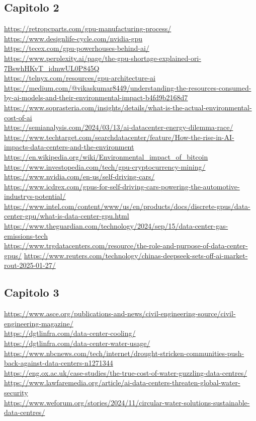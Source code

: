 \documentclass[12pt,a4paper,oneside]{book}
\begin{document}
\subsection*{Capitolo 2}
\url{https://retropcparts.com/gpu-manufacturing-process/} \\
\url{https://www.designlife-cycle.com/nvidia-gpu} \\
\url{https://tecex.com/gpu-powerhouses-behind-ai/} \\
\url{https://www.perplexity.ai/page/the-gpu-shortage-explained-ori-7BswhHKvT_idmwUL0P845Q} \\
\url{https://telnyx.com/resources/gpu-architecture-ai} \\
\url{https://medium.com/@vikaskumar8449/understanding-the-resources-consumed-by-ai-models-and-their-environmental-impact-b4fd9b2168d7} \\
\url{https://www.soprasteria.com/insights/details/what-is-the-actual-environmental-cost-of-ai} \\
\url{https://semianalysis.com/2024/03/13/ai-datacenter-energy-dilemma-race/} \\
\url{https://www.techtarget.com/searchdatacenter/feature/How-the-rise-in-AI-impacts-data-centers-and-the-environment} \\
\url{https://en.wikipedia.org/wiki/Environmental_impact_of_bitcoin} \\
\url{https://www.investopedia.com/tech/gpu-cryptocurrency-mining/} \\
\url{https://www.nvidia.com/en-us/self-driving-cars/} \\
\url{https://www.icdrex.com/gpus-for-self-driving-cars-powering-the-automotive-industrys-potential/} \\
\url{https://www.intel.com/content/www/us/en/products/docs/discrete-gpus/data-center-gpu/what-is-data-center-gpu.html} \\
\url{https://www.theguardian.com/technology/2024/sep/15/data-center-gas-emissions-tech} \\
\url{https://www.trgdatacenters.com/resource/the-role-and-purpose-of-data-center-gpus/}
\url{https://www.reuters.com/technology/chinas-deepseek-sets-off-ai-market-rout-2025-01-27/}

\subsection*{Capitolo 3}
\url{https://www.asce.org/publications-and-news/civil-engineering-source/civil-engineering-magazine/} \\
\url{https://dgtlinfra.com/data-center-cooling/} \\
\url{https://dgtlinfra.com/data-center-water-usage/} \\
\url{https://www.nbcnews.com/tech/internet/drought-stricken-communities-push-back-against-data-centers-n1271344} \\
\url{https://eng.ox.ac.uk/case-studies/the-true-cost-of-water-guzzling-data-centres/} \\
\url{https://www.lawfaremedia.org/article/ai-data-centers-threaten-global-water-security} \\
\url{https://www.weforum.org/stories/2024/11/circular-water-solutions-sustainable-data-centres/}

\newpage
\end{document}
